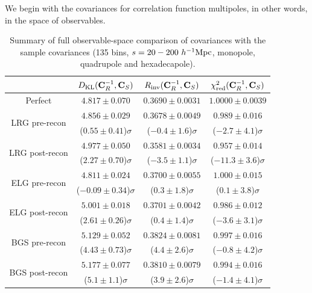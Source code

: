 We begin with the covariances for correlation function multipoles, in other words, in the space of observables. 

\begin{table}[tb]
\centering
\begin{tabular}{|c|c|c|c|}
\hline
 & $D_{\rm KL} ({\bf C}_R^{-1}, {\bf C}_S)$ & $R_{\rm inv} ({\bf C}_R^{-1}, {\bf C}_S)$ & $\chi^2_{\rm red} ({\bf C}_R^{-1}, {\bf C}_S)$ \\
\hline
Perfect & $4.817 \pm 0.070$ & $0.3690 \pm 0.0031$ & $1.0000 \pm 0.0039$ \\
\hline
\multirow{2}{*}{LRG pre-recon} & $4.856 \pm 0.029$ & $0.3678 \pm 0.0049$ & $0.989 \pm 0.016$ \\
 & ($0.55 \pm 0.41$)$\sigma$ & ($-0.4 \pm 1.6$)$\sigma$ & ($-2.7 \pm 4.1$)$\sigma$ \\
\hline
\multirow{2}{*}{LRG post-recon} & $4.977 \pm 0.050$ & $0.3581 \pm 0.0034$ & $0.957 \pm 0.014$ \\
 & ($2.27 \pm 0.70$)$\sigma$ & ($-3.5 \pm 1.1$)$\sigma$ & ($-11.3 \pm 3.6$)$\sigma$ \\
\hline
\multirow{2}{*}{ELG pre-recon} & $4.811 \pm 0.024$ & $0.3700 \pm 0.0055$ & $1.000 \pm 0.015$ \\
 & ($-0.09 \pm 0.34$)$\sigma$ & ($0.3 \pm 1.8$)$\sigma$ & ($0.1 \pm 3.8$)$\sigma$ \\
\hline
\multirow{2}{*}{ELG post-recon} & $5.001 \pm 0.018$ & $0.3701 \pm 0.0042$ & $0.986 \pm 0.012$ \\
 & ($2.61 \pm 0.26$)$\sigma$ & ($0.4 \pm 1.4$)$\sigma$ & ($-3.6 \pm 3.1$)$\sigma$ \\
\hline
\multirow{2}{*}{BGS pre-recon} & $5.129 \pm 0.052$ & $0.3824 \pm 0.0081$ & $0.997 \pm 0.016$ \\
 & ($4.43 \pm 0.73$)$\sigma$ & ($4.4 \pm 2.6$)$\sigma$ & ($-0.8 \pm 4.2$)$\sigma$ \\
\hline
\multirow{2}{*}{BGS post-recon} & $5.177 \pm 0.077$ & $0.3810 \pm 0.0079$ & $0.994 \pm 0.016$ \\
 & ($5.1 \pm 1.1$)$\sigma$ & ($3.9 \pm 2.6$)$\sigma$ & ($-1.4 \pm 4.1$)$\sigma$ \\
\hline
\end{tabular}
\caption[Full observable-space comparison of \rascalc{} covariances with the \desimock{} sample covariances]{Summary of full observable-space comparison of \rascalc{} covariances with the sample covariances (135 bins, $s=20-200~h^{-1}{\rm Mpc}$, monopole, quadrupole and hexadecapole).}
\label{tab:cov-comparison-full}
\end{table}

